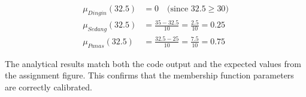 \documentclass{article}
\begin{document}
\begin{align}
\mu_{Dingin}(32.5) &= 0 \quad \text{(since } 32.5 \geq 30 \text{)} \\
\mu_{Sedang}(32.5) &= \frac{35 - 32.5}{10} = \frac{2.5}{10} = 0.25 \\
\mu_{Panas}(32.5)  &= \frac{32.5 - 25}{10} = \frac{7.5}{10} = 0.75
\end{align}

The analytical results match both the code output and the expected values from
the assignment figure. This confirms that the membership function parameters
are correctly calibrated. \checkmark



\end{document}
